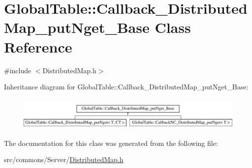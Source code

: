 \hypertarget{class_global_table_1_1_callback___distributed_map__put_nget___base}{
\section{GlobalTable::Callback\_\-DistributedMap\_\-putNget\_\-Base Class Reference}
\label{class_global_table_1_1_callback___distributed_map__put_nget___base}
}


{\ttfamily \#include $<$DistributedMap.h$>$}

Inheritance diagram for GlobalTable::Callback\_\-DistributedMap\_\-putNget\_\-Base:\begin{figure}[H]
\begin{center}
\leavevmode
\includegraphics[height=1.64706cm]{class_global_table_1_1_callback___distributed_map__put_nget___base}
\end{center}
\end{figure}


The documentation for this class was generated from the following file:\begin{DoxyCompactItemize}
\item 
src/commons/Server/\hyperlink{_distributed_map_8h}{DistributedMap.h}\end{DoxyCompactItemize}
